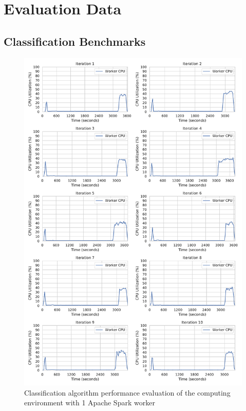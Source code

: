 \section{Evaluation Data}

\subsection{Classification Benchmarks}

\begin{figure}[h]
\centering
\includegraphics[scale=0.4]{images/07_evaluation/mortgage/mortgage_1_worker_cpu_performance}
\caption{Classification algorithm performance evaluation of the computing environment with 1 Apache Spark worker}
\label{fig:07_mortgage_static-cpu_results}
\end{figure}

